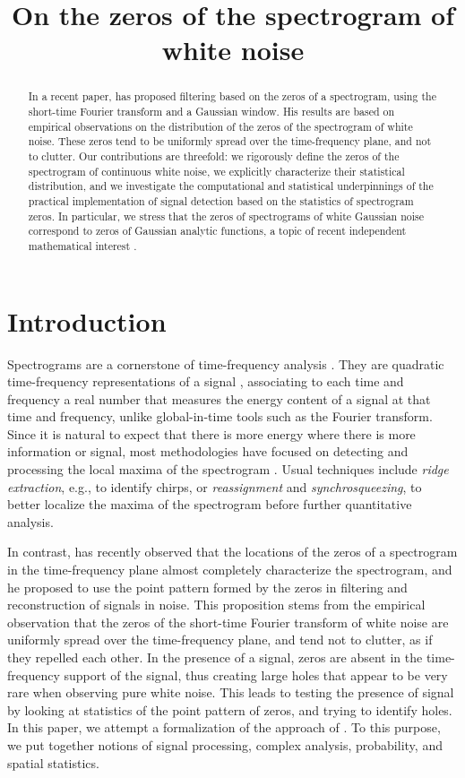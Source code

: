 \documentclass{article}
\title{On the zeros of the spectrogram of
  white noise}
\date{}
\theoremstyle{plain}
\theoremstyle{remark}
\begin{document}
\maketitle
\begin{abstract}
In a recent paper, \cite{Fla15} has proposed filtering based on the zeros of a
spectrogram, using the short-time Fourier transform and a Gaussian window. His
results are based on empirical observations on the distribution of the zeros of
the spectrogram of white noise. These zeros tend to be uniformly spread over the
time-frequency plane, and not to clutter. Our contributions are threefold:
we rigorously define the zeros of the spectrogram of continuous white noise, we
explicitly characterize their statistical distribution, and we investigate the
computational and statistical underpinnings of the practical implementation of
signal detection based on the statistics of spectrogram zeros. In
particular, we stress that the zeros of spectrograms of white Gaussian noise
correspond to zeros of Gaussian analytic functions, a topic of recent
independent mathematical interest \citep{HKPV09}.
\end{abstract}

\section{Introduction}
\label{s:intro}
Spectrograms are a cornerstone of time-frequency analysis \citep{Fla98}. They are quadratic time-frequency representations of a
signal \cite[Chapter 4]{Gro01}, associating to each time and frequency a real
number that measures the energy content of a signal at that time and frequency, unlike global-in-time tools such as the Fourier
transform. Since it is natural to expect that there is more energy where there
is more information or signal, most methodologies have focused on detecting and
processing the local maxima of the spectrogram \citep{Coh95, Fla98, Gro01}. Usual techniques include \emph{ridge extraction},
e.g., to identify chirps, or \emph{reassignment} and \emph{synchrosqueezing}, to
better localize the maxima of the spectrogram before further quantitative
analysis. 

In contrast, \cite{Fla15} has recently observed that the locations of the zeros of a
spectrogram in the time-frequency plane almost completely characterize the
spectrogram, and he proposed to use the point pattern formed by the zeros in
filtering and reconstruction of signals in noise. This proposition stems from
the empirical observation that the zeros of the short-time Fourier transform of
white noise are uniformly spread over the time-frequency plane, and tend not to
clutter, as if they repelled each other. In the presence of a signal, zeros are
absent in the time-frequency support of the signal, thus creating large holes
that appear to be very rare when observing pure white noise. This leads to testing
the presence of signal by looking at statistics of the point pattern of zeros,
and trying to identify holes. In this paper, we attempt a formalization of the
approach of \cite{Fla15}. To this purpose, we put together notions of signal
processing, complex analysis, probability, and spatial statistics.
\end{document}
